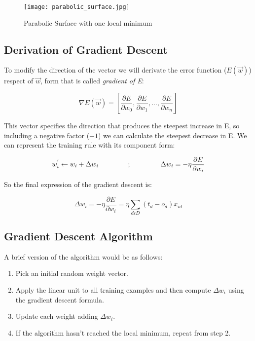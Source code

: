 	\begin{figure}[ht]
		\centering
		\texttt{[image: parabolic\_surface.jpg]}
		\caption{Parabolic Surface with one local minimum}
		\label{fig:parabolic_surf}
	\end{figure}

	\subsection{Derivation of Gradient Descent}
	To modify the direction of the vector we will derivate the error function ($E(\vec{w})$) respect of $\vec{w}$, form that is called \textit{gradient of E}:

	\begin{equation}
		\label{gradient_of_E}
		\nabla E(\vec{w})= [\frac{\partial{E}}{\partial{w_{0}}}, \frac{\partial{E}}{\partial{w_{1}}}, ..., \frac{\partial{E}}{\partial{w_{n}}}]
	\end{equation}

	This vector specifies the direction that produces the steepest increase in E, so including a negative factor ($-1$) we can calculate the steepest decrease in E. We can represent the training rule with its component form:

	\begin{equation}
		\label{training_rule_component_form}
		w_{i}^{'} \leftarrow w_{i} + \Delta w_{i} \hspace{1.5cm} ; \hspace{1.5cm} \Delta{w_{i}}=-\eta \frac{\partial{E}}{\partial{w_i}}
	\end{equation}

	So the final expression of the gradient descent is:

	\begin{equation}
		\label{gradient_descent_final_expr}
		\Delta w_i = -\eta \frac{\partial{E}}{\partial{w_i}} = \eta \sum_{d \varepsilon D} (t_d - o_d) x_{id}
	\end{equation}


	\subsection{Gradient Descent Algorithm}
	A brief version of the algorithm would be as follows:

	\begin{enumerate}

		\item Pick an initial random weight vector.
		\item Apply the linear unit to all training examples and then compute $\Delta w_i$  using the gradient descent formula.
		\item Update each weight adding $\Delta w_i$.
		\item If the algorithm hasn’t reached the local minimum, repeat from step 2.
	
	\end{enumerate}

